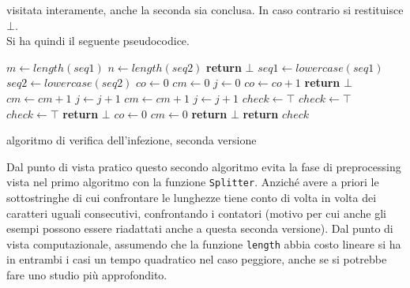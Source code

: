 \documentclass[a4paper,12pt, oneside]{book}
\begin{document}
visitata interamente, anche la seconda sia conclusa. In caso contrario si
restituisce $\bot$.\\
Si ha quindi il seguente pseudocodice.
\begin{algorithm}[H]
  \begin{algorithmic}
    \State $m \gets length(seq1)$
    \State $n \gets length(seq2)$
    \State \textbf{return} $\bot$
    \EndIf
    \State $seq1\gets lowercase(seq1)$
    \State $seq2\gets lowercase(seq2)$
    \State $co \gets 0$
    \State $cm \gets 0$
    \State $j \gets 0$
    \State $co \gets co+1$
    \If {$i==n-1$ \textbf{or} $seq1[i]\neq seq[i+1$}
    \State \textbf{return} $\bot$
    \EndIf
    \State $cm \gets cm+1$
    \State $j \gets j+1$
    \EndWhile
    \State $cm \gets cm+1$
    \State $j \gets j+1$
    \State $check \gets \top$
    \State $check \gets \top$
    \State $check \gets \top$
    \Else
    \State  \textbf{return} $\bot$
    \EndIf
    \State $co \gets 0$
    \State $cm \gets 0$
    \State  \textbf{return} $\bot$
    \EndIf
    \EndIf
    \EndFor
    \State \textbf{return} $check$
    \EndFunction
  \end{algorithmic}
  \caption{algoritmo di verifica dell'infezione, seconda versione}
\end{algorithm}
Dal punto di vista pratico questo secondo algoritmo evita la fase di
preprocessing vista nel primo algoritmo con la funzione
\texttt{Splitter}. Anziché avere a priori le sottostringhe di cui confrontare le
lunghezze tiene conto di volta in volta dei caratteri uguali consecutivi,
confrontando i contatori (motivo per cui anche gli esempi possono essere
riadattati anche a questa seconda versione). Dal
punto di vista computazionale, assumendo che la funzione \texttt{length} abbia
costo lineare si ha in entrambi i casi un tempo quadratico nel caso peggiore,
anche se si potrebbe fare uno studio più approfondito. 
\end{document}
